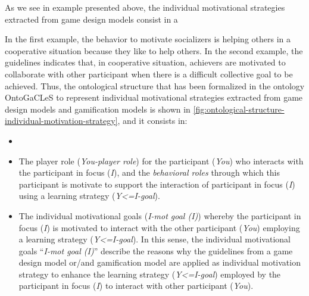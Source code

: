 As we see in  example presented above, the individual motivational strategies extracted from game design models consist in a 

 In the first example, the behavior to motivate socializers is helping others in a cooperative situation because they like to help others. In the second example, the guidelines indicates that, in cooperative situation, achievers are motivated to collaborate with other participant when there is a difficult collective goal to be achieved. Thus, the ontological structure that has been formalized in the ontology OntoGaCLeS to represent individual motivational strategies extracted from game design models and gamification models is shown in \autoref{fig:ontological-structure-individual-motivation-strategy}, and it consists in:

\begin{itemize}
\item


\item
The player role (\emph{You-player role}) for the participant (\emph{You}) who interacts with the participant in focus (\emph{I}), and the \emph{behavioral roles} through which this participant is motivate to support the interaction of participant in focus (\emph{I}) using a learning strategy (\emph{Y<=I-goal}).

\item
The individual motivational goals (\emph{I-mot goal (I)}) whereby the participant in focus (\emph{I}) is motivated to interact with the other participant (\emph{You}) employing a learning strategy (\emph{Y<=I-goal}). In this sense, the individual motivational goals “\emph{I-mot goal (I)}” describe the reasons why the guidelines from a game design model or/and gamification model are applied as individual motivation strategy to enhance the learning strategy (\emph{Y<=I-goal}) employed by the participant in focus (\emph{I}) to interact with other participant (\emph{You}).
\end{itemize}

